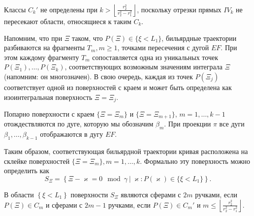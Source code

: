\begin{remark}
Классы $C_k'$ не определены при $k > \left\lfloor \frac{r_2^2}{r_2^2-r_1^2} \right\rfloor$, поскольку отрезки прямых $IV_k$ не пересекают области, относящиеся к таким $C_k$.
\end{remark}

Напомним, что при $\Xi$ таком, что $P(\Xi) \in \{\xi < L_1\}$, бильярдные траектории разбиваются на фрагменты $T_m, m \geq 1$, точками пересечения с дугой $EF$. При этом  каждому фрагменту  $T_m$ сопоставляется одна из уникальных точек $P(\Xi_1), \ldots, P(\Xi_k)$, соответствующих возможным значениям интеграла $\Xi$ (напомним: он многозначен). В свою очередь, каждая из точек $P(\Xi_j)$ соответствует одной из поверхностей с краем и может быть определена как изоинтегральная поверхность $\Xi = \Xi_j$.

Попарно поверхности с краем $\{\Xi = \Xi_m\}$ и $\{\Xi = \Xi_{m+1}\}$, $m=1, \ldots, k-1$ отождествляются по дуге, которую мы обозначим $\beta_m$. При проекции $\pi$ все дуги $\beta_1, \ldots, \beta_{k-1}$ отображаются в дугу $EF$.

Таким образом, соответствующая бильярдной траектории кривая расположена на склейке поверхностей $\{\Xi = \Xi_m\}, m=1,\ldots, k$.
Формально эту поверхность можно определить как 
$$S_\Xi = \left\{\Xi - \varkappa = 0 \mod \gamma  \ | \ \varkappa : P(\varkappa) \in \{\xi<L_1\} \right\}.$$

\begin{theorem}
В области $\left\{\xi < L_1\right\}$ поверхности $S_\Xi$ являются сферами с $2m$ ручками, если $P(\Xi) \in C_m$ и сферами с $2m-1$ ручками, если $P(\Xi) \in C_m'$ и $m \leq \left\lfloor \frac{r_2^2}{r_2^2-r_1^2} \right\rfloor$. 
\label{th:pt10:th1}
\end{theorem}



